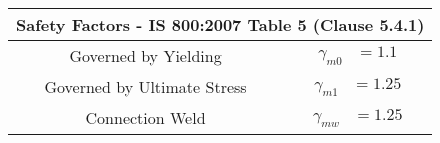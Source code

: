 \documentclass{article}%
\begin{document}
\begin{longtable}{|p{5cm}|p{2cm}|p{2cm}|p{2cm}|p{5cm}|}
\hline%
\hline%
\multicolumn{5}{|c|}{\textbf{Safety Factors {-} IS 800:2007 Table 5 (Clause 5.4.1) }}\\%
\hline%
\hline%
\multicolumn{3}{|c|}{Governed by Yielding}&\multicolumn{2}{|c|}{$\begin{aligned}\gamma_{m0}&=1.1\end{aligned}$}\\%
\hline%
\hline%
\multicolumn{3}{|c|}{Governed by Ultimate Stress}&\multicolumn{2}{|c|}{$\begin{aligned}\gamma_{m1}&=1.25\end{aligned}$}\\%
\hline%
\hline%
\multicolumn{3}{|c|}{Connection Weld}&\multicolumn{2}{|c|}{$\begin{aligned}\gamma_{mw}&=1.25\end{aligned}$}\\%
\hline%
\end{longtable}%
\end{document}
